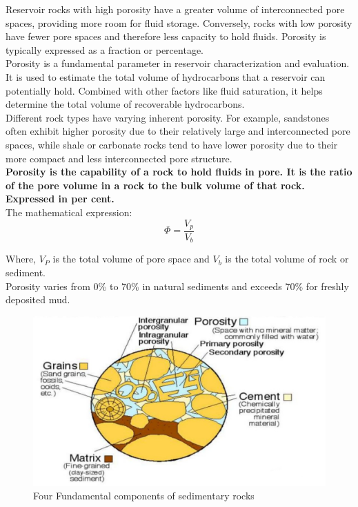 \documentclass{article}
\begin{document}
Reservoir rocks with high porosity have a greater volume of interconnected pore spaces, providing more room for fluid storage. Conversely, rocks with low porosity have fewer pore spaces and therefore less capacity to hold fluids. Porosity is typically expressed as a fraction or percentage.\\

Porosity is a fundamental parameter in reservoir characterization and evaluation. It is used to estimate the total volume of hydrocarbons that a reservoir can potentially hold. Combined with other factors like fluid saturation, it helps determine the total volume of recoverable hydrocarbons.\\

Different rock types have varying inherent porosity. For example, sandstones often exhibit higher porosity due to their relatively large and interconnected pore spaces, while shale or carbonate rocks tend to have lower porosity due to their more compact and less interconnected pore structure.\\ 

\textbf{ Porosity is the capability of a rock to hold fluids in pore.
It is the ratio of the pore volume in a rock to the bulk volume of that
rock. Expressed in per cent.}\\

The mathematical expression:
$$\Phi = \frac{V_p}{V_b}$$

Where, $V_P$ is the total volume of pore space and $V_b$ is the total volume of rock or sediment.\\

\textbullet Porosity varies from 0\% to 70\% in natural sediments and exceeds 70\% for freshly deposited mud.  

\begin{figure}
    \includegraphics[width=0.9\linewidth]{img/components.jpeg}
    \caption{Four Fundamental components of sedimentary rocks}
\end{figure}
\end{document}

